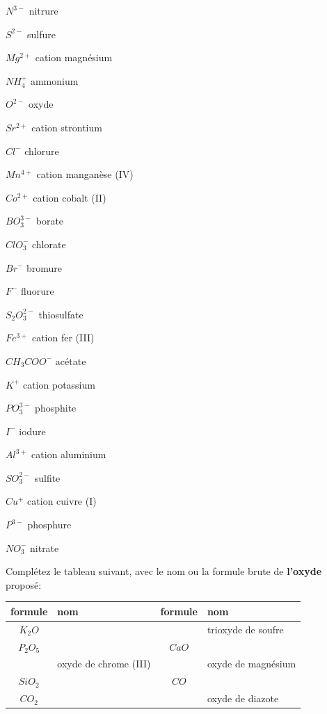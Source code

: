 \documentclass[
  11pt,
  a4paper,
  openany]{book}
\begin{document}
\begin{Answer}

\begin{multicols}{3}
\(N^{3-}\) nitrure

\(S^{2-}\) sulfure

\(Mg^{2+}\) cation magnésium

\(NH_4^{+}\) ammonium

\(O^{2-}\) oxyde

\(Sr^{2+}\) cation strontium

\(Cl^{-}\) chlorure

\(Mn^{4+}\) cation manganèse (IV)

\(Co^{2+}\) cation cobalt (II)

\(BO_3^{3-}\) borate

\(ClO_3^{-}\) chlorate

\(Br^{-}\) bromure

\(F^{-}\) fluorure

\(S_2O_3^{2-}\) thiosulfate

\(Fe^{3+}\) cation fer (III)

\(CH_3COO^{-}\) acétate

\(K^{+}\) cation potassium

\(PO_3^{3-}\) phosphite

\(I^{-}\) iodure

\(Al^{3+}\) cation aluminium

\(SO_3^{2-}\) sulfite

\(Cu^{+}\) cation cuivre (I)

\(P^{3-}\) phosphure

\(NO_3^{-}\) nitrate

\end{multicols}

\end{Answer}

\begin{Exercise}
Complétez le tableau suivant, avec le nom ou la formule brute de \textbf{l'oxyde} proposé:

\end{Exercise}

\begin{longtable}[]{@{}clcl@{}}
\toprule()
formule & nom & formule & nom \\
\midrule()
\endhead
\(K_2O\) & & & trioxyde de soufre \\
\(P_2O_5\) & & \(CaO\) & \\
& oxyde de chrome (III) & & oxyde de magnésium \\
\(SiO_2\) & & \(CO\) & \\
\(CO_2\) & & & oxyde de diazote \\
\bottomrule()
\end{longtable}
\end{document}
